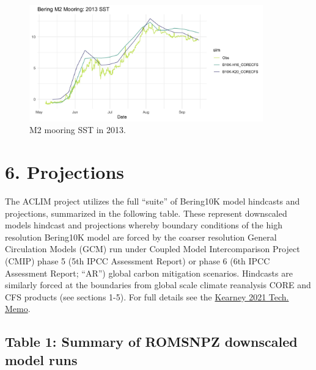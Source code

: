\documentclass[
]{article}
\begin{document}
\begin{figure}
\centering
\includegraphics[width=0.9\textwidth,height=\textheight]{Figs/Hind_M2_SST.jpg}
\caption{M2 mooring SST in 2013.}
\end{figure}

\hypertarget{projections}{%
\section{6. Projections}\label{projections}}

The ACLIM project utilizes the full ``suite'' of Bering10K model
hindcasts and projections, summarized in the following table. These
represent downscaled models hindcast and projections whereby boundary
conditions of the high resolution Bering10K model are forced by the
coarser resolution General Circulation Models (GCM) run under Coupled
Model Intercomparison Project (CMIP) phase 5 (5th IPCC Assessment
Report) or phase 6 (6th IPCC Assessment Report; ``AR'') global carbon
mitigation scenarios. Hindcasts are similarly forced at the boundaries
from global scale climate reanalysis CORE and CFS products (see sections
1-5). For full details see the
\href{https://beringnpz.github.io/roms-bering-sea/assets/DRAFT_NOAA-TM-AFSC-415.pdf}{Kearney
2021 Tech. Memo}.

\hypertarget{table-1-summary-of-romsnpz-downscaled-model-runs}{%
\subsection{Table 1: Summary of ROMSNPZ downscaled model
runs}\label{table-1-summary-of-romsnpz-downscaled-model-runs}}
\end{document}
